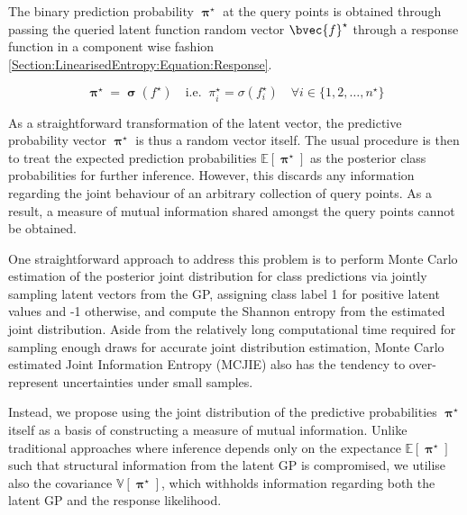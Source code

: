 \documentclass{article}
\renewcommand{\vec}[1]{\boldsymbol{#1}}
\begin{document}
		The binary prediction probability $\vec{\uppi^{\star}}$ at the query points is obtained through passing the queried latent function random vector $\bvec{f}^{\star}$ through a response function in a component wise fashion \eqref{Section:LinearisedEntropy:Equation:Response}.
		
		\begin{equation}
			\vec{\uppi}^{\star} = \vec{\upsigma}(f^{\star})\mathrm{ \quad i.e. \;\;}\pi^{\star}_{i} = \sigma(f^{\star}_{i}) \quad \forall i \in \{1, 2, \dots, n^{\star}\}
		\label{Section:LinearisedEntropy:Equation:Response}
		\end{equation}
		
		As a straightforward transformation of the latent vector, the predictive probability vector $\vec{\uppi^{\star}}$ is thus a random vector itself. The usual procedure is then to treat the expected prediction probabilities $\mathbb{E}[\vec{\uppi^{\star}}]$ as the posterior class probabilities for further inference. However, this discards any information regarding the joint behaviour of an arbitrary collection of query points. As a result, a measure of mutual information shared amongst the query points cannot be obtained.
		
		One straightforward approach to address this problem is to perform Monte Carlo estimation of the posterior joint distribution for class predictions via jointly sampling latent vectors from the GP, assigning class label 1 for positive latent values and -1 otherwise, and compute the Shannon entropy \cite{ShannonEntropy} from the estimated joint distribution. Aside from the relatively long computational time required for sampling enough draws for accurate joint distribution estimation, Monte Carlo estimated Joint Information Entropy (MCJIE) also has the tendency to over-represent uncertainties under small samples.
				
		Instead, we propose using the joint distribution of the predictive probabilities $\vec{\uppi^{\star}}$ itself as a basis of constructing a measure of mutual information. Unlike traditional approaches where inference depends only on the expectance $\mathbb{E}[\vec{\uppi^{\star}}]$ such that structural information from the latent GP is compromised, we utilise also the covariance $\mathbb{V}[\vec{\uppi^{\star}}]$, which withholds information regarding both the latent GP and the response likelihood.
	
\end{document}
